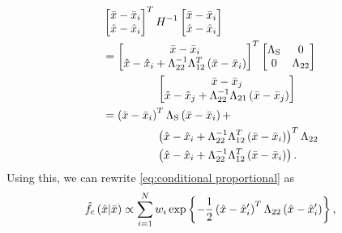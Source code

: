 \begin{align*}
	&\begin{bmatrix} 
		\variableparta - \datapointparta{\indexdata} \\ 
		\variablepartb - \datapointpartb{\indexdata} 
	\end{bmatrix}^T 
	\bandwidthmatrix^{-1}
	\begin{bmatrix} 
		\variableparta - \datapointparta{\indexdata} \\ 
		\variablepartb - \datapointpartb{\indexdata} 
	\end{bmatrix} \\
	&= \begin{bmatrix} 
		\variableparta - \datapointparta{\indexdata} \\ 
		\variablepartb - \datapointpartb{\indexdata} + \bwibr^{-1} \bwiur^T \left(\variableparta - \datapointparta{\indexdata} \right)
	\end{bmatrix}^T 
	\begin{bmatrix} 
		\bwischur  & 0 \\ 
		0 & \bwibr 
	\end{bmatrix} \\
	&\superquad \begin{bmatrix}
		\variableparta - \datapointparta{\indexsampling} \\
		\variablepartb - \datapointpartb{\indexsampling} + \bwibr^{-1}\bwibl \left(\variableparta - \datapointparta{\indexsampling} \right)
	\end{bmatrix} \\
	&= \left(\variableparta - \datapointparta{\indexdata}\right)^T 
	\bwischur 
	\left(\variableparta - \datapointparta{\indexdata}\right) + \nonumber \\
	&\superquad \left( \variablepartb - \datapointpartb{\indexdata} + \bwibr^{-1} \bwiur^T \left(\variableparta - \datapointparta{\indexdata} \right) \right)^T
	\bwibr \\
	&\superquad \left( \variablepartb - \datapointpartb{\indexdata} + \bwibr^{-1} \bwiur^T \left(\variableparta - \datapointparta{\indexdata} \right) \right).
\end{align*}
Using this, we can rewrite \cref{eq:conditional proportional} as
\begin{equation}
	\label{eq:final conditional hard}
	\hat{f}_{\mathrm{c}}\left( \hat{x} | \bar{x} \right) 
	\propto \sum_{i=1}^{N} w_{i}
	\exp\left\{  -\frac{1}{2} \left( \hat{x} - \hat{x}_{i}' \right)^T \Lambda_{22} \left( \hat{x} - \hat{x}_{i}' \right) \right\},
\end{equation}
